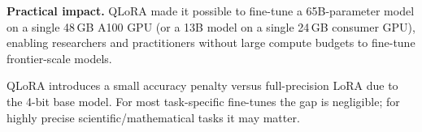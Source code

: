 \textbf{Practical impact.} QLoRA made it possible to fine-tune a 65B-parameter model
on a single 48\,GB A100 GPU (or a 13B model on a single 24\,GB consumer GPU), enabling
researchers and practitioners without large compute budgets to fine-tune frontier-scale
models.

\begin{notebox}
  QLoRA introduces a small accuracy penalty versus full-precision LoRA due to the 4-bit
  base model. For most task-specific fine-tunes the gap is negligible; for highly
  precise scientific/mathematical tasks it may matter.
\end{notebox}
